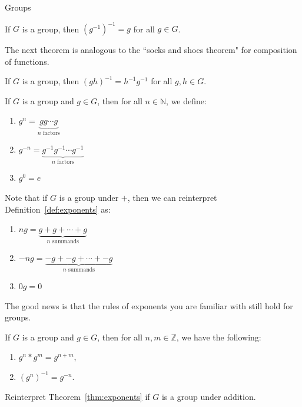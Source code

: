 \begin{section}{Groups}
\begin{theorem}
If $G$ is a group, then $(g^{-1})^{-1}=g$ for all $g\in G$.
\end{theorem}

The next theorem is analogous to the ``socks and shoes theorem" for composition of functions.

\begin{theorem}
If $G$ is a group, then $(gh)^{-1}=h^{-1}g^{-1}$ for all $g,h\in G$.
\end{theorem}

\begin{definition}\label{def:exponents}
If $G$ is a group and $g\in G$, then for all $n\in \mathbb{N}$, we define:
\begin{enumerate}[label=\rm{(\alph*)}]
\item $g^n=\underbrace{gg\cdots g}_{n\text{ factors}}$
\item $g^{-n}=\underbrace{g^{-1}g^{-1}\cdots g^{-1}}_{n\text{ factors}}$
\item $g^0=e$
\end{enumerate}
\end{definition}

Note that if $G$ is a group under $+$, then we can reinterpret Definition~\ref{def:exponents} as:
\begin{enumerate}[label=\rm{(\alph*)}]
\item $ng=\underbrace{g+g+\cdots +g}_{n\text{ summands}}$
\item $-ng=\underbrace{-g+-g+\cdots +-g}_{n\text{ summands}}$
\item $0g=0$
\end{enumerate}

The good news is that the rules of exponents you are familiar with still hold for groups.

\begin{theorem}\label{thm:exponents}
If $G$ is a group and $g\in G$, then for all $n,m\in\mathbb{Z}$, we have the following:
\begin{enumerate}[label=\rm{(\alph*)}]
\item $g^n*g^m=g^{n+m}$,
\item $(g^n)^{-1}=g^{-n}$.
\end{enumerate}
\end{theorem}

\begin{problem}
Reinterpret Theorem~\ref{thm:exponents} if $G$ is a group under addition.
\end{problem}

\end{section}

